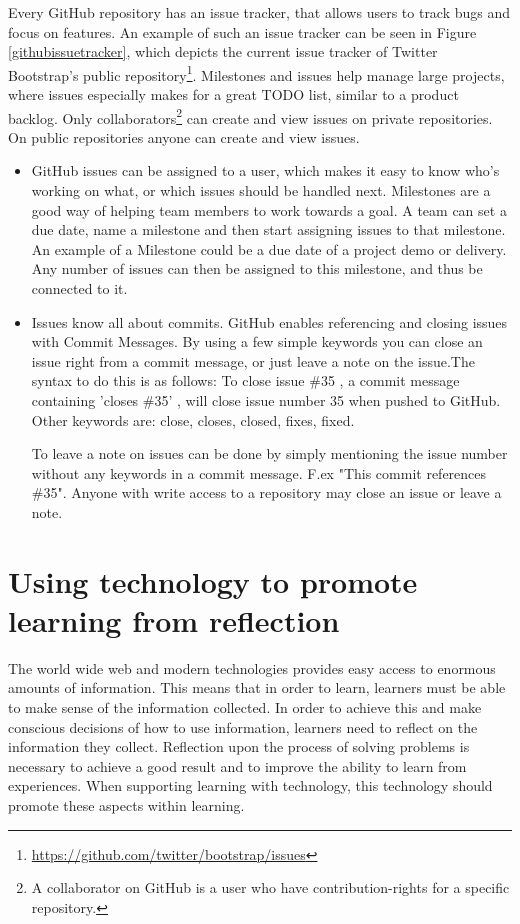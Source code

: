 Every GitHub repository has an issue tracker, that allows users to track bugs and focus on features. An example of such an issue tracker can be seen in Figure \ref{githubissuetracker}, which depicts the current issue tracker of Twitter Bootstrap's public repository\footnote{\url{https://github.com/twitter/bootstrap/issues}}. Milestones and issues help manage large projects, where issues especially makes for a great TODO list, similar to a product backlog. Only collaborators\footnote{A collaborator on GitHub is a user who have contribution-rights for a specific repository.} can create and view issues on private repositories. On public repositories anyone can create and view issues. 
\begin{itemize}
\item GitHub issues can be assigned to a user, which makes it easy to know who's working on what, or which issues should be handled next. Milestones are a good way of helping team members to work towards a goal. A team can set a due date, name a milestone and then start assigning issues to that milestone. An example of a Milestone could be a due date of a project demo or delivery. Any number of issues can then be assigned to this milestone, and thus be connected to it. 
\item Issues know all about commits. GitHub enables referencing and closing issues with Commit Messages. By using a few simple keywords you can close an issue right from a commit message, or just leave a note on the issue.The syntax to do this is as follows: To close issue \#35 , a commit message containing 'closes \#35' , will close issue number 35 when pushed to GitHub. Other keywords are: close, closes, closed, fixes, fixed. 

To leave a note on issues can be done by simply mentioning the issue number without any keywords in a commit message. F.ex "This commit references \#35". Anyone with write access to a repository may close an issue or leave a note.
\end{itemize}

\section{Using technology to promote learning from reflection}
The world wide web and modern technologies provides easy access to enormous amounts of information. This means that in order to learn, learners must be able to make sense of the information collected.  
In order to achieve this and make conscious decisions of how to use information, learners need to reflect on the information they collect. Reflection upon the process of solving problems is necessary to achieve a good result and to improve the ability to learn from experiences. When supporting learning with technology, this technology should promote these aspects within learning\citep{Lin1999}. 


